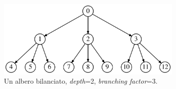 \begin{figure}
    \centering
    \begin{subfigure}[b]{0.4\textwidth}
        \includegraphics[width=\textwidth]{./sezione3/experimental_results/plots/tree_graph.png}
        \caption{Un albero bilanciato, \emph{depth}=2, \emph{branching factor}=3.}
        \label{fig:balanced_tree}
    \end{subfigure}
    \qquad
    \begin{subfigure}[b]{0.1\textwidth}
        \centering

\end{subfigure}
\end{figure}
